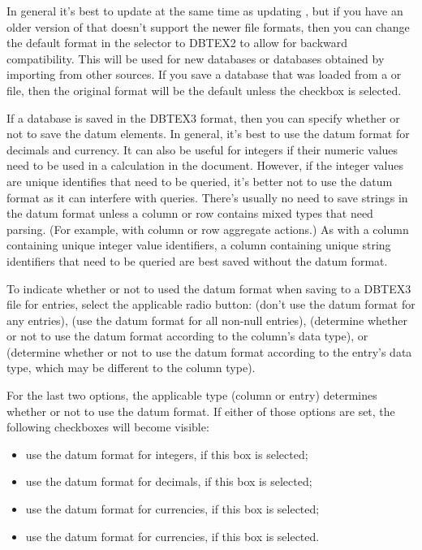 In general it's best to update  at the same time as
updating , but if you have an older version of
 that doesn't support the newer file formats, then you
can change the default format in the 
selector to \gls{DBTEX2} to allow for backward compatibility.  This
will be used for new databases or databases obtained by importing
from other sources.  If you save a database that was loaded from a
 or  file, then the original format will be
the default unless the 
checkbox is selected.

If a database is saved in the \gls{DBTEX3} format, then you can
specify whether or not to save the datum elements. In general, it's
best to use the datum format for decimals and currency. It can also
be useful for integers if their numeric values need to be used in a
calculation in the document. However, if the integer values are
unique identifies that need to be queried, it's better not to use
the datum format as it can interfere with queries. There's usually
no need to save strings in the datum format unless a column or row
contains mixed types that need parsing. (For example, with column or row
aggregate actions.) As with a column containing unique integer value
identifiers, a column containing unique string identifiers that need
to be queried are best saved without the datum format.

To indicate whether or not to used the datum format when saving to a
\gls{DBTEX3} file for entries, select the applicable radio button:
 (don't use the datum format
for any entries),  (use the
datum format for all non-null entries), 
 (determine whether
or not to use the datum format according to the column's data type),
or  (determine whether
or not to use the datum format according to the entry's data type,
which may be different to the column type).

For the last two options, the applicable type (column or entry)
determines whether or not to use the datum format. If either of
those options are set, the following checkboxes will become visible:

\begin{itemize}
\item {} use the datum
format for integers, if this box is selected;
\item {} use the datum
format for decimals, if this box is selected;
\item {} use the datum
format for currencies, if this box is selected;
\item {} use the datum
format for currencies, if this box is selected.
\end{itemize}

